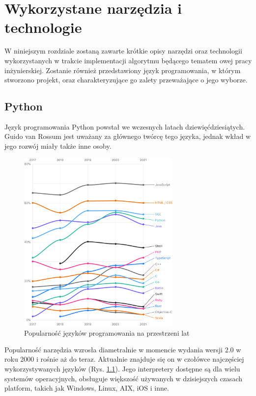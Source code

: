 \chapter{Wykorzystane narzędzia i technologie}
\label{cha:wykorzystaneNarzedziaITechnologie}
W niniejszym rozdziale zostaną zawarte krótkie opisy narzędzi oraz technologii wykorzystanych w trakcie implementacji algorytmu będącego tematem owej pracy inżynierskiej. Zostanie również przedstawiony język programowania, w którym stworzono projekt, oraz charakteryzujące go zalety przeważające o jego wyborze. 


\section{Python}
Język programowania Python \cite{PythonWiki} powstał we wczesnych latach dziewięćdziesiątych. Guido van Rossum jest uważany za głównego twórcę tego języka, jednak wkład w jego rozwój miały także inne osoby. 

\begin{figure}[h]
	\centering
	\includegraphics[width=8cm]{zdjęcia/python.png}
	\caption{Popularność języków programowania na przestrzeni lat \cite{pythonLanguages}} 
	\label{fig:programmingLang}
\end{figure}

Popularność narzędzia wzrosła diametralnie w momencie wydania wersji $2.0$ w roku 2000 i rośnie aż do teraz. Aktualnie znajduje się on w czołówce najczęściej wykorzystywanych języków (Rys. \ref{fig:programmingLang}). Jego interpretery dostępne są dla wielu systemów operacyjnych, obsługuje większość używanych w dzisiejszych czasach platform, takich jak Windows, Linux, AIX, iOS i inne.

